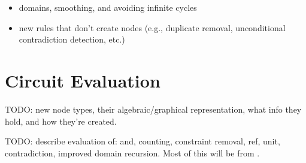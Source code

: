 \documentclass{article}
\theoremstyle{definition}
\begin{document}
\begin{itemize}
\item domains, smoothing, and avoiding infinite cycles
\item new rules that don't create nodes (e.g., duplicate removal, unconditional contradiction detection, etc.)
\end{itemize}

\section{Circuit Evaluation}

TODO: new node types, their algebraic/graphical representation, what info they hold, and how they're created.

TODO: describe evaluation of: and, counting, constraint removal, ref, unit, contradiction, improved domain recursion. Most of this will be from \cite{DBLP:conf/ijcai/BroeckTMDR11}.



\end{document}
